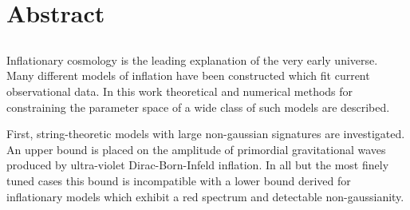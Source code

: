 \renewcommand{\CVSrevision}{\version$Id: abstract.tex,v 1.11 2009/08/21 10:44:51 ith Exp $}
% 
% 
\chapter*{Abstract}
\label{ch:abstract}
\section*{}
\singlespacing
Inflationary cosmology is the leading explanation of the very early universe. 
Many different models of inflation have been constructed which fit current observational data.
In this work theoretical and numerical methods for constraining the parameter space of a wide class
of such models are described.

First, string-theoretic models with large non-gaussian signatures are investigated.
An upper bound is placed on the amplitude of primordial gravitational waves produced by ultra-violet
Dirac-Born-Infeld inflation. In all but the most finely tuned cases this bound is incompatible with
a lower bound derived for inflationary models which exhibit a red spectrum and detectable
non-gaussianity. 


